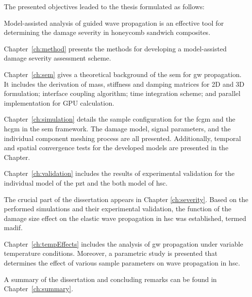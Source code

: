 The presented objectives leaded to the thesis formulated as follows:
\begin{thesis*}  
	Model-assisted analysis of guided wave propagation is an effective tool for determining the damage severity in honeycomb sandwich composites.
\label{thesis}
\end{thesis*}

Chapter~\ref{ch:method} presents the methods for developing a model-assisted damage severity assessment scheme.

Chapter~\ref{ch:sem} gives a theoretical background of the \ac{sem} for \ac{gw} propagation.
It includes the derivation of mass, stiffness and damping matrices for 2D and 3D formulation; interface coupling algorithm; time integration scheme; and parallel implementation for GPU calculation.

Chapter~\ref{ch:simulation} details the sample configuration for the \ac{fcgm} and the \ac{hcgm} in the \ac{sem} framework.
The damage model, signal parameters, and the individual component meshing process are all presented. Additionally, temporal and spatial convergence tests for the developed models are presented in the Chapter.

Chapter~\ref{ch:validation} includes the results of experimental validation for the individual model of the \ac{pzt} and the both model of \ac{hsc}.

The crucial part of the dissertation appears in Chapter \ref{ch:severity}.
Based on the performed simulations and their experimental validation, the function of the damage size effect on the elastic wave propagation in \ac{hsc} was established, termed \ac{madif}.

Chapter~\ref{ch:tempEffects} includes the analysis of \ac{gw} propagation under variable temperature conditions. Moreover, a parametric study is presented that determines the effect of various sample parameters on wave propagation in \ac{hsc}.

A summary of the dissertation and concluding remarks can be found in Chapter~\ref{ch:summary}.
